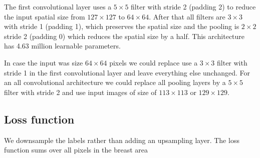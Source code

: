 	The first convolutional layer uses a $5 \times 5$ filter with stride 2 (padding 2) to reduce the input spatial size from $127 \times 127$ to $64 \times 64$. After that all filters are $3 \times 3$ with stride 1 (padding 1), which preserves the spatial size and the pooling is $2\times 2$ stride 2 (padding 0) which reduces the spatial size by a half. This architecture has 4.63 million learnable parameters. 

	In case the input was size $64 \times 64$ pixels we could replace use a $3 \times 3$ filter with stride 1 in the first convolutional layer and leave everything else unchanged. For an all convolutional architecture we could replace all pooling layers by a $5 \times 5$ filter  with stride 2 and use input images of size of $113 \times 113$ or $129 \times 129$.



\subsection{Loss function}
We downsample the labels rather than adding an upsampling layer. The loss function sums over all pixels in the breast area
